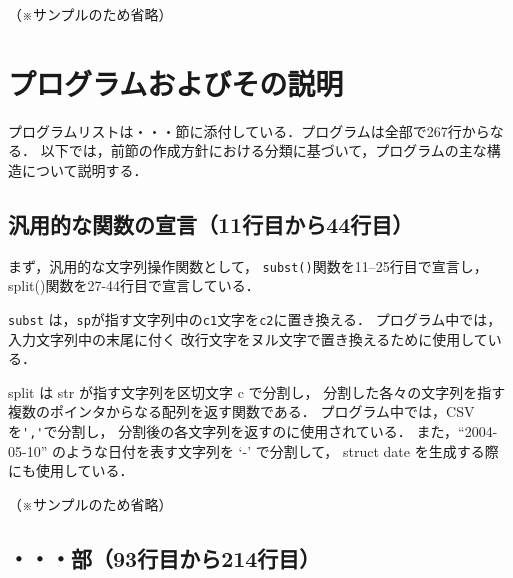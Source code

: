 \documentclass[a4j,11pt]{jarticle}
\begin{document}
（※サンプルのため省略）

\section{プログラムおよびその説明}



プログラムリストは・・・節に添付している．プログラムは全部で267行からなる．
以下では，前節の作成方針における分類に基づいて，プログラムの主な構造について説明する．

\subsection{汎用的な関数の宣言（11行目から44行目）}

まず，汎用的な文字列操作関数として，
\verb|subst()|関数を11--25行目で宣言し， %
split()関数を27-44行目で宣言している．       %

\verb|subst| は，\verb|sp|が指す文字列中の\verb|c1|文字を\verb|c2|に置き換える．
プログラム中では，入力文字列中の末尾に付く
改行文字をヌル文字で置き換えるために使用している．

split は str が指す文字列を区切文字 c で分割し，
分割した各々の文字列を指す複数のポインタからなる配列を返す関数である．
プログラム中では，CSVを\verb|','|で分割し，
分割後の各文字列を返すのに使用されている．
また，``2004-05-10'' のような日付を表す文字列を `-' で分割して，
struct date を生成する際にも使用している．

（※サンプルのため省略）

\subsection{・・・部（93行目から214行目）}
\end{document}
